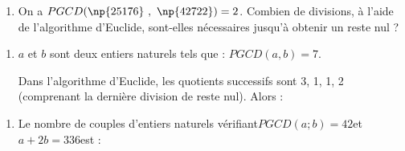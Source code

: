 \documentclass{cornouaille}
\begin{document}
\begin{QCM}
\begin{GroupeQCM}
\begin{enumerate}
\setcounter{enumi}{\value{questionqcm}}
\item 
On a \enskip $PGCD(\np{25176}~,~\np{42722})=2$. Combien de divisions, à l'aide de l'algorithme d'Euclide, sont-elles nécessaires jusqu'à obtenir un reste nul ?
\end{enumerate}
\setcounter{enumii}{0}
\begin{solution}
\end{solution}

\begin{enumerate}
\setcounter{enumi}{\value{questionqcm}}
\item 
$a$ et $b$ sont deux entiers naturels tels que : \enskip $PGCD(a,b)=7$.

Dans l'algorithme d'Euclide, les quotients successifs sont 3, 1, 1, 2 (comprenant la dernière division de reste nul). Alors : 
\end{enumerate}
\setcounter{enumii}{0}
\begin{solution}
\end{solution}

\begin{enumerate}
\setcounter{enumi}{\value{questionqcm}}
\item 
Le nombre de couples d'entiers naturels vérifiant\enskip $PGCD(a;b)=42$\enskip et\enskip $a+2b=336$\enskip est :
\end{enumerate}
\setcounter{enumii}{0}
\begin{solution}
\end{solution}
\end{GroupeQCM}
\end{QCM}
\end{document}
